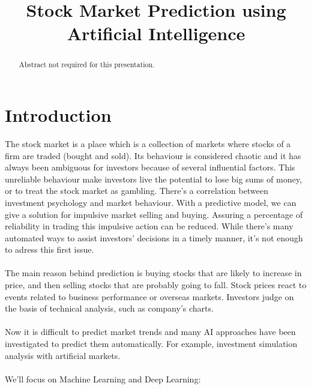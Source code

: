 \documentclass[conference]{IEEEtran}
\begin{document}
\title{Stock Market Prediction using \\Artificial Intelligence}
\author{
}
\maketitle
\begin{abstract}
Abstract not required for this presentation.
\end{abstract}
\IEEEpeerreviewmaketitle
\section{Introduction}
The stock market is a place which is a collection of markets where stocks of a firm are traded (bought and sold)\cite{M2018}.
Its behaviour is considered chaotic \cite{Singh2016} and it has always been ambiguous for investors
because of several influential factors. This unreliable behaviour make investors live the potential to lose big sums of money, or to treat
the stock market as gambling. There's a correlation between investment psychology and market behaviour. With a predictive model, we can give a 
solution for impulsive market selling and buying. Assuring a percentage of reliability in trading this impulsive action can be reduced. While there's many automated ways to assist investors' decisions
in a timely manner\cite{nabipour2020predicting}, it's not enough to adress this first issue.
\\\\
The main reason behind prediction is buying stocks that are likely to increase in price, and then selling stocks that are probably going to fall\cite{nabipour2020predicting}. 
Stock prices react to events related to business performance or overseas markets. Investors judge on the basis of technical analysis, such as company's charts\cite{Akita2016}.
\\\\
Now it is difficult to predict market trends and many AI approaches
have been investigated to predict them automatically. For example, investment simulation analysis with artificial
 markets\cite{Akita2016}.
\\\\
We'll focus on Machine Learning and Deep Learning:
\end{document}

